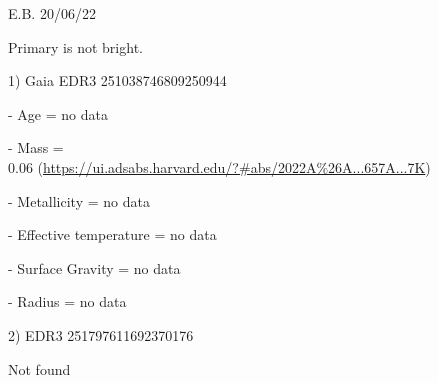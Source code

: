 E.B. 20/06/22

Primary is not bright.


1) Gaia EDR3 251038746809250944


- Age = no data

- Mass =\\
0.06 (\url{https://ui.adsabs.harvard.edu/?#abs/2022A%26A...657A...7K})

- Metallicity = no data

- Effective temperature = no data

- Surface Gravity = no data

- Radius = no data


2) EDR3 251797611692370176

Not found
